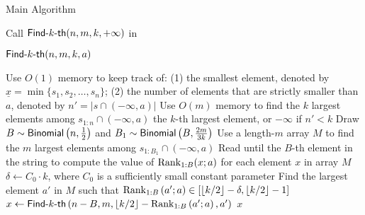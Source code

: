 \begin{algorithm2e}
    \caption{Main Algorithm} \label{algorithm.main}
    Call $\textsf{Find-}k\textsf{-th}(n, m, k, +\infty)$ in \;
\end{algorithm2e}


\begin{algorithm2e}
    \caption{$\textsf{Find-}k\textsf{-th}(n, m, k, a)$}
    \label{algorithm.recurse}
    Use $O(1)$ memory to keep track of: (1) the smallest element, denoted by $\underline{x} = \min\{s_1, s_2, \ldots, s_n\}$; (2) the number of elements that are strictly smaller than $a$, denoted by $n' = |s \cap (-\infty, a)|$\;
     {
        Use $O(m)$ memory to find the $k$ largest elements among $s_{1:n} \cap (-\infty, a)$\;\label{line:naive} 
        \Return the $k$-th largest element, or $-\infty$ if $n' < k$\;
    }
    Draw $B \sim \mathsf{Binomial}\left(n, \frac{1}{2}\right)$ and $B_1 \sim \mathsf{Binomial}\left(B, \frac{2m}{3k}\right)$\; \label{line:draw-B-1}
    Use a length-$m$ array $M$ to find the $m$ largest elements among $s_{1:B_1} \cap (-\infty, a)$\; \label{line:first-half}
    Read until the $B$-th element in the string to compute the value of $\mathrm{Rank}_{1:B}(x; a)$ for each element $x$ in array $M$\;
    $\delta \leftarrow C_0\cdot k$, where $C_0$ is a sufficiently small constant parameter\;
    Find the largest element $a'$ in $M$ such that $\mathrm{Rank}_{1:B}\left(a'; a\right) \in [\lfloor k/2 \rfloor - \delta, \lfloor k/2 \rfloor - 1]$\;\label{line:find-a'}
    $x \gets \textsf{Find-}k\textsf{-th}\left(n - B, m, \left\lfloor k / 2\right\rfloor - \mathrm{Rank}_{1:B}\left(a'; a\right), a'\right)$\;\label{line:recursive-call}
    \label{line:translate-infinity-to-smallest}
    \Return $x$\;\label{line.end}
\end{algorithm2e}

